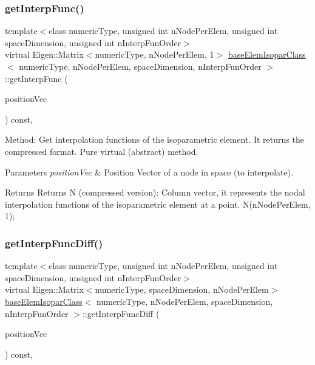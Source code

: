 \subsubsection{\texorpdfstring{get\+Interp\+Func()}{evalInterpFunc()}}
{\footnotesize\ttfamily template$<$class numeric\+Type, unsigned int n\+Node\+Per\+Elem, unsigned int space\+Dimension, unsigned int n\+Interp\+Fun\+Order$>$ \\
virtual Eigen\+::\+Matrix$<$numeric\+Type, n\+Node\+Per\+Elem, 1$>$ \mbox{\hyperlink{classbase_elem_isopar_class}{base\+Elem\+Isopar\+Class}}$<$ numeric\+Type, n\+Node\+Per\+Elem, space\+Dimension, n\+Interp\+Fun\+Order $>$\+::get\+Interp\+Func (\begin{DoxyParamCaption}\item[{const Matrix$<$ numeric\+Type, space\+Dimension, 1 $>$ \&}]{position\+Vec }\end{DoxyParamCaption}) const\hspace{0.3cm}{\ttfamily [protected]}, {}}

Method\+: Get interpolation functions of the isoparametric element. It returns the compressed format. Pure virtual (abstract) method. 
\begin{DoxyParams}{Parameters}
{\em position\+Vec} & Position Vector of a node in space (to interpolate). \\
\hline
\end{DoxyParams}
\begin{DoxyReturn}{Returns}
Returns N (compressed version)\+: Column vector, it represents the nodal interpolation functions of the isoparametric element at a point. N(n\+Node\+Per\+Elem, 1); 
\end{DoxyReturn}
\mbox{\label{classbase_elem_isopar_class_ad157a292e3faeb3e95665cf29195e0f0}} 
\subsubsection{\texorpdfstring{get\+Interp\+Func\+Diff()}{evalInterpFuncDiff()}}
{\footnotesize\ttfamily template$<$class numeric\+Type, unsigned int n\+Node\+Per\+Elem, unsigned int space\+Dimension, unsigned int n\+Interp\+Fun\+Order$>$ \\
virtual Eigen\+::\+Matrix$<$numeric\+Type, space\+Dimension, n\+Node\+Per\+Elem$>$ \mbox{\hyperlink{classbase_elem_isopar_class}{base\+Elem\+Isopar\+Class}}$<$ numeric\+Type, n\+Node\+Per\+Elem, space\+Dimension, n\+Interp\+Fun\+Order $>$\+::get\+Interp\+Func\+Diff (\begin{DoxyParamCaption}\item[{const Matrix$<$ numeric\+Type, space\+Dimension, 1 $>$ \&}]{position\+Vec }\end{DoxyParamCaption}) const\hspace{0.3cm}{\ttfamily [protected]}, {}}

